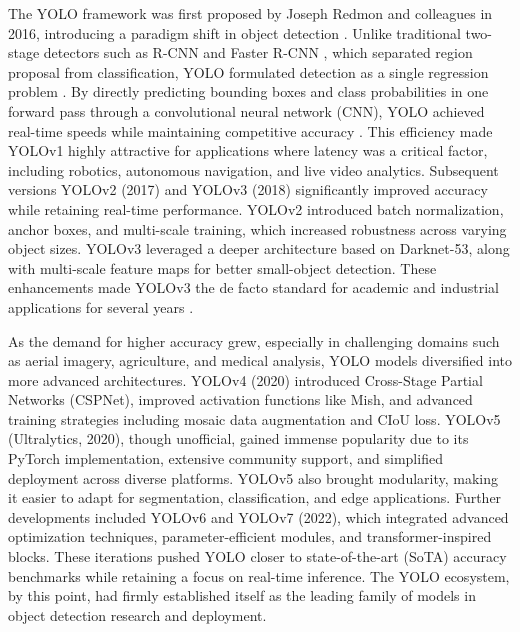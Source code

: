 \documentclass{article}
\begin{document}
The YOLO framework was first proposed by Joseph Redmon and colleagues in 2016, introducing a paradigm shift in object detection \cite{redmon2016you}. Unlike traditional two-stage detectors such as R-CNN \cite{he2017mask} and Faster R-CNN \cite{ren2016faster}, which separated region proposal from classification, YOLO formulated detection as a single regression problem \cite{diwan2023object}. By directly predicting bounding boxes and class probabilities in one forward pass through a convolutional neural network (CNN), YOLO achieved real-time speeds while maintaining competitive accuracy \cite{ali2024yolo, diwan2023object}. This efficiency made YOLOv1 highly attractive for applications where latency was a critical factor, including robotics, autonomous navigation, and live video analytics. Subsequent versions YOLOv2 (2017)  \cite{redmon2017yolo9000}and YOLOv3 (2018) \cite{redmon2018yolov3} significantly improved accuracy while retaining real-time performance. YOLOv2 introduced batch normalization, anchor boxes, and multi-scale training, which increased robustness across varying object sizes. YOLOv3 leveraged a deeper architecture based on Darknet-53, along with multi-scale feature maps for better small-object detection. These enhancements made YOLOv3 the de facto standard for academic and industrial applications for several years \cite{apostolidis2025delving, sapkota2025yolo, edozie2025comprehensive}. 

As the demand for higher accuracy grew, especially in challenging domains such as aerial imagery, agriculture, and medical analysis, YOLO models diversified into more advanced architectures. YOLOv4 (2020) \cite{bochkovskiy2020yolov4} introduced Cross-Stage Partial Networks (CSPNet), improved activation functions like Mish, and advanced training strategies including mosaic data augmentation and CIoU loss. YOLOv5 (Ultralytics, 2020), though unofficial, gained immense popularity due to its PyTorch implementation, extensive community support, and simplified deployment across diverse platforms. YOLOv5 also brought modularity, making it easier to adapt for segmentation, classification, and edge applications. Further developments included YOLOv6\cite{li2022yolov6} and YOLOv7 \cite{wang2023yolov7} (2022), which integrated advanced optimization techniques, parameter-efficient modules, and transformer-inspired blocks. These iterations pushed YOLO closer to state-of-the-art (SoTA) accuracy benchmarks while retaining a focus on real-time inference. The YOLO ecosystem, by this point, had firmly established itself as the leading family of models in object detection research and deployment. 
\end{document}
